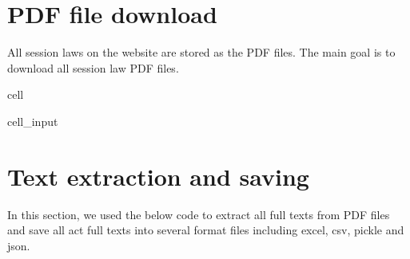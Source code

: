 \documentclass[letterpaper,10pt,english]{jupyterBook}
\begin{document}
\section{PDF file download}
\label{\detokenize{ch36:pdf-file-download}}
\sphinxAtStartPar
All session laws on the website are stored as the PDF files. The main goal is to download all session law PDF files.

\begin{sphinxuseclass}{cell}\begin{sphinxVerbatimInput}

\begin{sphinxuseclass}{cell_input}
\begin{sphinxVerbatim}[commandchars=\\\{\}]
 \PYG{p}{[}\PYG{p}{]}
  

   
      

   
\end{sphinxVerbatim}

\end{sphinxuseclass}\end{sphinxVerbatimInput}

\end{sphinxuseclass}

\section{Text extraction and saving}
\label{\detokenize{ch36:text-extraction-and-saving}}
\sphinxAtStartPar
In this section, we used the below code to extract all full texts from PDF files and save all act full texts into several format files including excel, csv, pickle and json.
\end{document}
